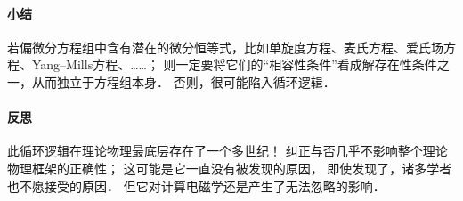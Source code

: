 \paragraph{小结}
若偏微分方程组中含有潜在的微分恒等式，比如单旋度方程、麦氏方程、爱氏场方程、Yang--Mills方程、……；
则一定要将它们的“相容性条件”看成解存在性条件之一，从而独立于方程组本身．
否则，很可能陷入循环逻辑．


\paragraph{反思}
{\kaishu 此循环逻辑在理论物理最底层存在了一个多世纪！}
纠正与否几乎不影响整个理论物理框架的正确性；
这可能是它一直没有被发现的原因，
即使发现了，诸多学者也不愿接受的原因．
但它对计算电磁学还是产生了无法忽略的影响．



\endinput
